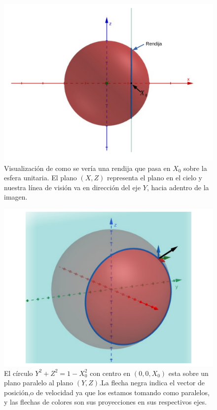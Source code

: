 \documentclass{book}
\begin{document}
\begin{figure}
    \centering
    \includegraphics[width=\textwidth]{imagenes_corregidas/n_esfe_01.pdf}
    \caption{Visualización de como se vería una rendija que pasa en $X_0$ sobre la esfera unitaria. El plano $(X,Z)$ representa el plano en el cielo y nuestra línea de visión va en dirección del eje $Y$, hacia adentro de la imagen.}
    \label{fig: ap PV rendija}
\end{figure}

\begin{figure}
    \centering
    \includegraphics[width=\textwidth]{imagenes_corregidas/n_esfe_02.pdf}
    \caption{El círculo $Y^2+Z^2=1-X_0^2$ con centro en $(0,0,X_0)$ esta sobre un plano paralelo al plano $(Y,Z)$.La flecha negra indica el vector de posición,o de velocidad ya que los estamos tomando como paralelos, y las flechas de colores son sus proyecciones en sus respectivos ejes.}
    \label{fig:ap PV esfera3d}
\end{figure}
\end{document}
